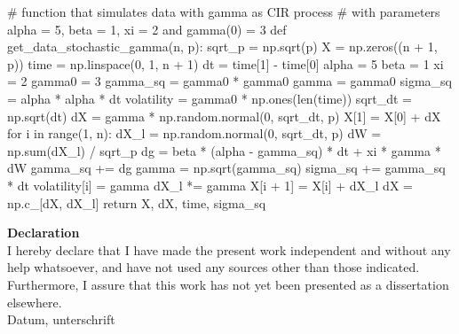 \documentclass[a4paper,11pt]{book}
\theoremstyle{plain}
\theoremstyle{definition}
\begin{document}
\begin{python}
# function that simulates data with gamma as CIR process
# with parameters alpha = 5, beta = 1, xi = 2 and gamma(0) = 3   
def get_data_stochastic_gamma(n, p):
    sqrt_p = np.sqrt(p)
    X = np.zeros((n + 1, p))
    time = np.linspace(0, 1, n + 1)
    dt = time[1] - time[0]
    alpha = 5
    beta = 1
    xi = 2
    gamma0 = 3
    gamma_sq = gamma0 * gamma0
    gamma = gamma0
    sigma_sq = alpha * alpha * dt
    volatility = gamma0 * np.ones(len(time))
    sqrt_dt = np.sqrt(dt)
    dX = gamma * np.random.normal(0, sqrt_dt, p)
    X[1] = X[0] + dX
    for i in range(1, n):
        dX_l = np.random.normal(0, sqrt_dt, p)
        dW = np.sum(dX_l) / sqrt_p
        dg = beta * (alpha - gamma_sq) * dt + xi * gamma * dW
        gamma_sq += dg
        gamma = np.sqrt(gamma_sq)
        sigma_sq += gamma_sq * dt
        volatility[i] = gamma
        dX_l *= gamma
        X[i + 1] = X[i] + dX_l
        dX = np.c_[dX, dX_l]
    return X, dX, time, sigma_sq
    
\end{python}
    	
   	
   	\nocite{*}
   	
   	
   	\newpage
   	\large
   	\textbf{Declaration} \\
   	
   	I hereby declare that I have made the present work independent and without any help whatsoever, and have not used any sources other than those indicated.\\
   	
   	Furthermore, I assure that this work has not yet been presented as a dissertation elsewhere. \\
   	
   	Datum, unterschrift
\end{document}
